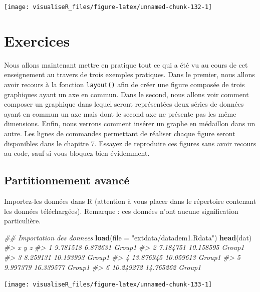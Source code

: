 \documentclass[]{article}
\newenvironment{Shaded}{\begin{snugshade}}{\end{snugshade}}
\newcommand{\CommentTok}[1]{\textcolor[rgb]{0.56,0.35,0.01}{\textit{#1}}}
\newcommand{\DataTypeTok}[1]{\textcolor[rgb]{0.13,0.29,0.53}{#1}}
\newcommand{\KeywordTok}[1]{\textcolor[rgb]{0.13,0.29,0.53}{\textbf{#1}}}
\newcommand{\NormalTok}[1]{#1}
\newcommand{\StringTok}[1]{\textcolor[rgb]{0.31,0.60,0.02}{#1}}
\begin{document}
\begin{center}\texttt{[image: visualiseR\_files/figure-latex/unnamed-chunk-132-1]} \end{center}

\hypertarget{exercices}{%
\section{Exercices}\label{exercices}}

Nous allons maintenant mettre en pratique tout ce qui a été vu au cours de cet enseignement au travers de trois exemples pratiques. Dans le premier, nous allons avoir recours à la fonction \texttt{layout()} afin de créer une figure composée de trois graphiques ayant un axe en commun. Dans le second, nous allons voir comment composer un graphique dans lequel seront représentées deux séries de données ayant en commun un axe mais dont le second axe ne présente pas les même dimensions. Enfin, nous verrons comment insérer un graphe en médaillon dans un autre. Les lignes de commandes permettant de réaliser chaque figure seront disponibles dans le chapitre 7. Essayez de reproduire ces figures sans avoir recours au code, sauf si vous bloquez bien évidemment.

\hypertarget{partitionnement-avancuxe9-1}{%
\subsection{Partitionnement avancé}\label{partitionnement-avancuxe9-1}}

Importez-les données dans R (attention à vous placer dans le répertoire contenant les données téléchargées). Remarque : ces données n'ont aucune signification particulière.

\begin{Shaded}
\begin{Highlighting}[]
\CommentTok{## Importation des donnees}
\KeywordTok{load}\NormalTok{(}\DataTypeTok{file =} \StringTok{"extdata/datadem1.Rdata"}\NormalTok{)}
\KeywordTok{head}\NormalTok{(dat)}
\CommentTok{#>           x         y      z}
\CommentTok{#> 1  9.781518  6.872631 Group1}
\CommentTok{#> 2  7.184751 10.158595 Group1}
\CommentTok{#> 3  8.259131 10.193993 Group1}
\CommentTok{#> 4 13.876945 10.059613 Group1}
\CommentTok{#> 5  9.997379 16.339577 Group1}
\CommentTok{#> 6 10.249272 14.765262 Group1}
\end{Highlighting}
\end{Shaded}

\begin{center}\texttt{[image: visualiseR\_files/figure-latex/unnamed-chunk-133-1]} \end{center}
\end{document}
